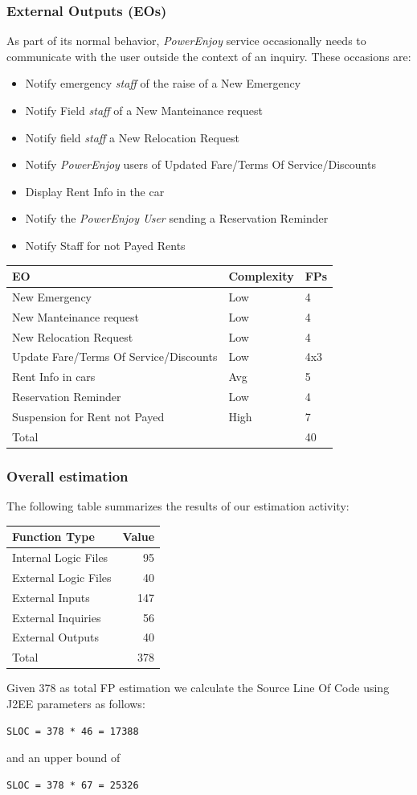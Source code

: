 \documentclass[english]{article}
\newenvironment{fpcounttable}[1]{
	\begin{center}
	\begin{longtable}{|l|l|l|}
	\hline 
	#1 & Complexity & FPs \\\hline
}{
	\end{longtable}\end{center}
}
\newenvironment{fptotaltable}{
	\begin{center}
	\begin{longtable}{|l|r|}
	\hline 
	Function Type & Value \\\hline
}{
	\end{longtable}\end{center}
}
\newcommand{\fptotal}[1]{
	\multicolumn{2}{|l|}{{Total}}
	& #1\\\hline
}
\newcommand{\powerenjoy}{\textit{PowerEnjoy }}
\newcommand{\powerenjoyuser}{\textit{PowerEnjoy User }}
\newcommand{\staff}{\textit{staff }}
\newcommand{\eoh}{ & High & 7}
\newcommand{\eoa}{ & Avg & 5}
\newcommand{\eol}{ & Low & 4}
\begin{document}
\subsubsection{External Outputs (EOs)}
As part of its normal behavior, \powerenjoy service occasionally needs to communicate with the user outside the context of an inquiry. These occasions are:
\begin{itemize}
	\item Notify emergency \staff of the raise of a New Emergency
	\item Notify Field \staff of a New Manteinance request 
	\item Notify field \staff a New Relocation Request
	\item Notify \powerenjoy users of Updated Fare/Terms Of Service/Discounts
	\item Display Rent Info in the car
	\item Notify the \powerenjoyuser sending a Reservation Reminder
	\item Notify Staff for not Payed Rents
\end{itemize}
\pagebreak
\begin{fpcounttable}{EO}
New Emergency\eol\\
New Manteinance request \eol\\
New Relocation Request\eol\\
Update Fare/Terms Of Service/Discounts \eol x3\\
Rent Info in cars \eoa\\
Reservation Reminder\eol\\
Suspension for Rent not Payed\eoh\\\hline 
\fptotal{40}	
\end{fpcounttable}

\subsubsection{Overall estimation}
The following table summarizes the results of our estimation activity:

\begin{fptotaltable}
	Internal Logic Files & 95 \\
	External Logic Files & 40 \\
	External Inputs & 147 \\
	External Inquiries & 56 \\
	External Outputs & 40 \\\hline
	Total & 378\\\hline
\end{fptotaltable}
Given 378 as total FP estimation we calculate the Source Line Of Code using J2EE parameters as follows:
\begin{lstlisting}[stepnumber=0]
	SLOC = 378 * 46 = 17388
\end{lstlisting}
and an upper bound of
\begin{lstlisting}[stepnumber=0]
	SLOC = 378 * 67 = 25326
\end{lstlisting}
\end{document}
